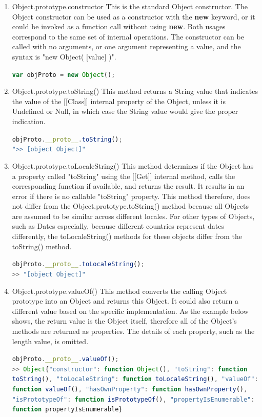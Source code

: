 \documentclass[a4paper,11pt,twoside]{report}
\def\jsinline{\lstinline[language=JavaScript, basicstyle=\small]}%\end{lstlisting}
\begin{document}
\begin{enumerate}
\item Object.prototype.constructor \newline
This is the standard Object constructor. The Object constructor can be used as a constructor with the \textbf{new} keyword, or it could be invoked as a function call without using \textbf{new}. Both usages correspond to the same set of internal operations. The constructor can be called with no arguments, or one argument representing a value, and the syntax is "new Object( [value] )".

\jsinline|var objProto = new Object();|

\item Object.prototype.toString() \newline
This method returns a String value that indicates the value of the [[Class]] internal property of the Object, unless it is Undefined or Null, in which case the String value would give the proper indication.

\jsinline|objProto.__proto__.toString();| \\
\jsinline|">> [object Object]"|

\item Object.prototype.toLocaleString() \newline
This method determines if the Object has a property called "toString" using the [[Get]] internal method, calls the corresponding function if available, and returns the result. It results in an error if there is no callable "toString" property. This method therefore, does not differ from the Object.prototype.toString() method because all Objects are assumed to be similar across different locales. For other types of Objects, such as Dates especially, because different countries represent dates differently, the toLocaleString() methods for these objects differ from the toString() method.

\jsinline|objProto.__proto__.toLocaleString();| \\
\jsinline|>> "[object Object]"|

\item Object.prototype.valueOf() \newline
This method converts the calling Object prototype into an Object and returns this Object. It could also return a different value based on the specific implementation. As the example below shows, the return value is the Object itself, therefore all of the Object's methods are returned as properties. The details of each property, such as the length value, is omitted.
\begin{adjustwidth}{0cm}{2.5cm}
\jsinline|objProto.__proto__.valueOf();| \\
\jsinline|>> Object{"constructor": function Object(), "toString": function toString(), "toLocaleString": function toLocaleString(), "valueOf": function valueOf(), "hasOwnProperty": function hasOwnProperty(), "isPrototypeOf": function isPrototypeOf(), "propertyIsEnumerable": function propertyIsEnumerable}|
\end{adjustwidth}


\end{enumerate}
\end{document}
